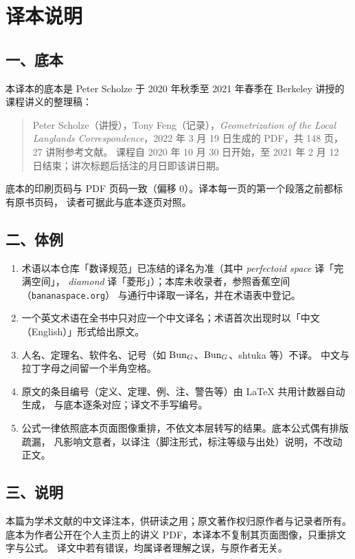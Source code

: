 \chapter*{译本说明}

\section*{一、底本}

本译本的底本是 Peter Scholze 于 2020 年秋季至 2021 年春季在 Berkeley 讲授的课程讲义的整理稿：

\begin{quote}
Peter Scholze（讲授），Tony Feng（记录），\emph{Geometrization of the Local Langlands
Correspondence}，2022 年 3 月 19 日生成的 PDF，共 148 页，27 讲附参考文献。
课程自 2020 年 10 月 30 日开始，至 2021 年 2 月 12 日结束；讲次标题后括注的月日即该讲日期。
\end{quote}

底本的印刷页码与 PDF 页码一致（偏移 0）。译本每一页的第一个段落之前都标有原书页码，
读者可据此与底本逐页对照。

\section*{二、体例}

\begin{enumerate}
  \item 术语以本仓库「数译规范」已冻结的译名为准（其中 \emph{perfectoid space} 译「完满空间」，
        \emph{diamond} 译「菱形」）；本库未收录者，参照香蕉空间（\texttt{bananaspace.org}）
        与通行中译取一译名，并在术语表中登记。
  \item 一个英文术语在全书中只对应一个中文译名；术语首次出现时以「中文（English）」形式给出原文。
  \item 人名、定理名、软件名、记号（如 $\mathrm{Bun}_G$、${\mathrm{Bun}_G}$、shtuka 等）不译。
        中文与拉丁字母之间留一个半角空格。
  \item 原文的条目编号（定义、定理、例、注、警告等）由 \LaTeX{} 共用计数器自动生成，
        与底本逐条对应；译文不手写编号。
  \item 公式一律依照底本页面图像重排，不依文本层转写的结果。底本公式偶有排版疏漏，
        凡影响文意者，以译注（脚注形式，标注等级与出处）说明，不改动正文。
\end{enumerate}

\section*{三、说明}

本篇为学术文献的中文译注本，供研读之用；原文著作权归原作者与记录者所有。
底本为作者公开在个人主页上的讲义 PDF，本译本不复制其页面图像，只重排文字与公式。
译文中若有错误，均属译者理解之误，与原作者无关。
